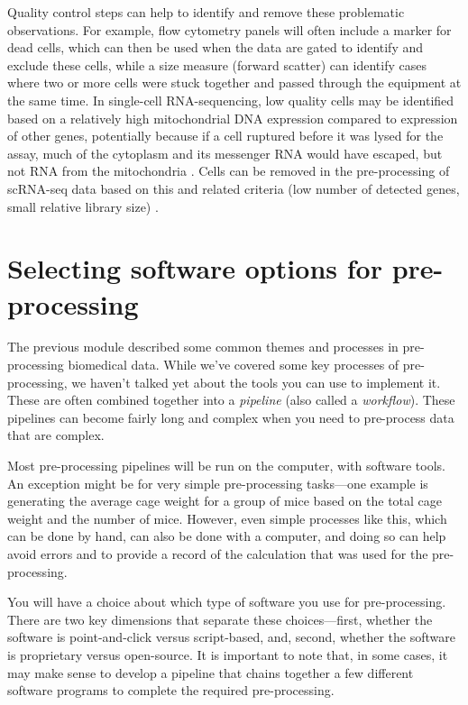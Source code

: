 \documentclass[]{tufte-book}
\begin{document}
Quality control steps can help to identify and remove these problematic
observations. For example, flow cytometry panels will often include a marker for
dead cells, which can then be used when the data are gated to identify and
exclude these cells, while a size measure (forward scatter) can identify cases
where two or more cells were stuck together and passed through the equipment at
the same time. In single-cell RNA-sequencing, low quality cells may be
identified based on a relatively high mitochondrial DNA expression compared to
expression of other genes, potentially because if a cell ruptured before it was
lysed for the assay, much of the cytoplasm and its messenger RNA would have
escaped, but not RNA from the mitochondria \citep{ilicic2016classification}. Cells
can be removed in the pre-processing of scRNA-seq data based on this and related
criteria (low number of detected genes, small relative library size)
\citep{ilicic2016classification}.

\section{Selecting software options for pre-processing}\label{module12a}

The previous module described some common themes and processes in pre-processing
biomedical data. While we've covered some key processes of pre-processing, we
haven't talked yet about the tools you can use to implement it. These are often
combined together into a \emph{pipeline} (also called a \emph{workflow}). These pipelines can
become fairly long and complex when you need to pre-process data that are
complex.

Most pre-processing pipelines will be run on the computer, with software tools. An
exception might be for very simple pre-processing tasks---one example is
generating the average cage weight for a group of mice based on the total cage
weight and the number of mice. However, even simple processes like this, which
can be done by hand, can also be done with a computer, and doing so can help
avoid errors and to provide a record of the calculation that was used for the
pre-processing.

You will have a choice about which type of software you use for pre-processing.
There are two key dimensions that separate these choices---first, whether the
software is point-and-click versus script-based, and, second, whether the
software is proprietary versus open-source. It is important to note
that, in some cases, it may make sense to develop a pipeline that chains
together a few different software programs to complete the required
pre-processing.
\end{document}
